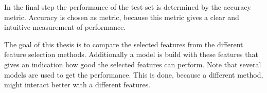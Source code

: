 \npar

In the final step the performance of the test set is determined by the accuracy metric. Accuracy is chosen as metric, because this metric gives a clear and intuitive measurement of performance.

\npar

The goal of this thesis is to compare the selected features from the different feature selection methods. Additionally a model is build with these features that gives an indication how good the selected features can perform. Note that several models are used to get the performance. This is done, because a different method, might interact better with a different features.




